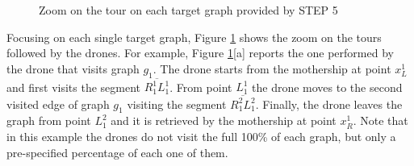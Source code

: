 \begin{figure}[h!]
    \centering
    \qquad
     \qquad
    \caption{Zoom on the tour on each target graph provided by STEP 5}%
    \label{fig:example5}%
\end{figure}

\noindent 
Focusing on each single target graph, Figure \ref{fig:example5} shows the zoom on the tours followed by the drones. For example, Figure \ref{fig:example5}[a] reports the one performed by the drone that visits graph $g_1$. The drone starts from the mothership at point $x^1_L$ and first visits the segment $\overline{R^1_1L^1_1}$. From point $L^1_1$ the drone moves to the second visited edge of graph $g_1$ visiting the segment $\overline{R^2_1L^2_1}$.
Finally, the drone leaves the graph from point $L^2_1$ and it is retrieved by the mothership at point $x^1_R$. Note that in this example the drones do not visit the full 100\% of each graph, but only a pre-specified percentage of each one of them.

